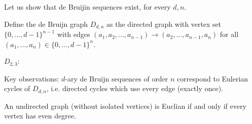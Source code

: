 Let us show that de Bruijin sequences exist, for every $d,n$. 
\begin{definition}
Define the de Bruijn graph $D_{d,n}$ as the directed graph with vertex set $\{0,\ldots,d-1\}^{n-1}$ with edges $(a_1,a_2,\ldots,a_{n-1})\to (a_2,\ldots,a_{n-1},a_n)$ for all $(a_1,\ldots,a_n)\in\{0,\ldots,d-1\}^n$.
\end{definition}

\begin{example}
$D_{2,3}$:\\
\begin{center}
\end{center}
\end{example}

Key observations: $d$-ary de Bruijn sequences of order $n$ correspond to Eulerian cycles of $D_{d,n}$, i.e. directed cycles which use every edge (exactly once).

\begin{theorem}[Euler]
An undirected graph (without isolated vertices) is Euclian if and only if every vertex has even degree.
\end{theorem}